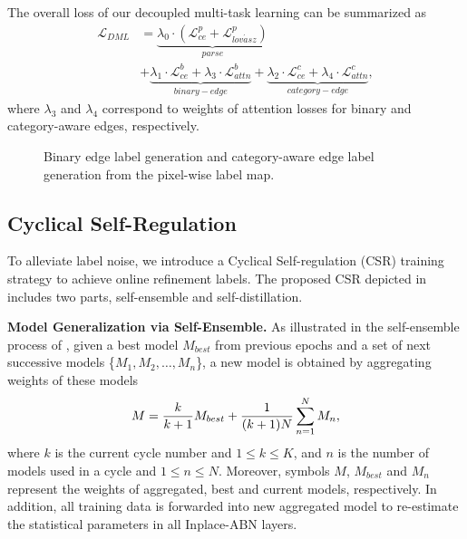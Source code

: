 \documentclass[10pt,twocolumn,letterpaper]{article}
\begin{document}
The overall loss of our decoupled multi-task learning can be summarized as
\small
\begin{equation}
\begin{aligned}
\mathcal{L}_{DML} &= \underbrace{\lambda_{0} \cdot (\mathcal{L}^p_{ce} + \mathcal{L}^p_{lov\acute{a}sz})}_{parse} \\
&+  \underbrace{\lambda_{1} \cdot \mathcal{L}^{b}_{ce} + \lambda_{3} \cdot \mathcal{L}_{attn}^{b}}_{binary-edge} 
+ \underbrace{\lambda_{2} \cdot \mathcal{L}^{c}_{ce} + \lambda_{4} \cdot \mathcal{L}_{attn}^{c}}_{category-edge},
\end{aligned}
\label{eq:dmlloss}
\end{equation}
\normalsize
where $\lambda_{3}$ and $\lambda_{4}$ correspond to weights of attention losses for binary and category-aware edges, respectively.

\begin{figure}
\centering
{}
\vspace{-2.5mm}
\caption{Binary edge label generation and category-aware edge label generation from the pixel-wise label map.}
\vspace{-4mm}
\label{fig:edgegeneration}
\end{figure}

\subsection{Cyclical Self-Regulation}

To alleviate label noise, we introduce a Cyclical Self-regulation (CSR) training strategy to achieve online refinement labels. The proposed CSR depicted in \figureautorefname{ \ref{fig:framwork}} includes two parts, self-ensemble  and self-distillation.
 
\noindent\textbf{Model Generalization via Self-Ensemble.}  As illustrated in the self-ensemble process of \figureautorefname{ \ref{fig:framwork}}, given a best model $M_{best}$ from previous epochs and a set of next successive models \{$M_1, M_2, \dots, M_n$\}, a new model is obtained by aggregating weights of these models
\begin{equation}
\small
M = \frac{k}{k + 1} M_{best} + \frac{1}{(k+1)N} \sum_{n=1}^{N}M_{n},
\end{equation}
where $k$ is the current cycle number and $1\leq k\leq K$, and $n$ is the number of models used in a cycle and $1\leq n\leq N$. Moreover, symbols $M$, $M_{best}$ and $M_{n}$ represent the weights of aggregated, best and current models, respectively. In addition, all training data is forwarded into new aggregated model to re-estimate the statistical parameters in all Inplace-ABN \cite{inplace} layers.   
\end{document}
